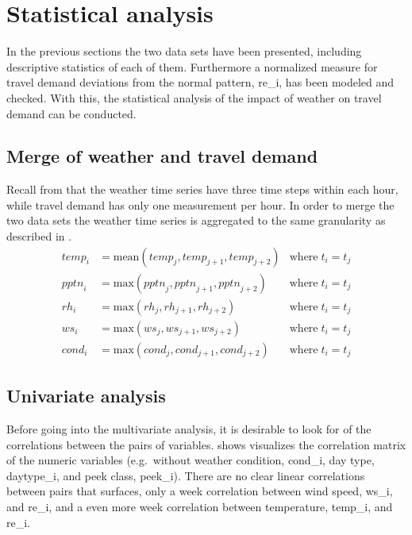 
\section{Statistical analysis}
In the previous sections the two data sets have been presented, including descriptive statistics of each of them. Furthermore a normalized measure for travel demand deviations from the normal pattern, \gls{re_i}, has been modeled and checked. With this, the statistical analysis of the impact of weather on travel demand can be conducted.

\subsection{Merge of weather and travel demand}
Recall from  that the weather time series have three time steps within each hour, while travel demand has only one measurement per hour. In order to merge the two data sets the weather time series is aggregated to the same granularity as described in .
\begin{align}
	\mathit{temp}_i &= \mathrm{mean}(\mathit{temp}_j, \mathit{temp}_{j + 1}, \mathit{temp}_{j + 2}) &\text{where} \; t_i = t_j 
	\label{eq:temp_i} \\
	\mathit{pptn}_i &= \mathrm{max}(\mathit{pptn}_j, \mathit{pptn}_{j + 1}, \mathit{pptn}_{j + 2}) &\text{where} \; t_i = t_j 
	\label{eq:pptn_i} \\
	\mathit{rh}_i &= \mathrm{max}(\mathit{rh}_j, \mathit{rh}_{j + 1}, \mathit{rh}_{j + 2}) &\text{where} \; t_i = t_j 
	\label{eq:rh_i} \\
	\mathit{ws}_i &= \mathrm{max}(\mathit{ws}_j, \mathit{ws}_{j + 1}, \mathit{ws}_{j + 2}) &\text{where} \; t_i = t_j
	\label{eq:ws_i} \\	
	\mathit{cond}_i &= \mathrm{max}(\mathit{cond}_j, \mathit{cond}_{j + 1}, \mathit{cond}_{j + 2}) &\text{where} \; t_i = t_j 
	\label{eq:cond_i}
\end{align}

\subsection{Univariate analysis}
Before going into the multivariate analysis, it is desirable to look for  of the correlations between the pairs of variables.  shows visualizes the correlation matrix of the numeric variables (e.g.\ without weather condition, \gls{cond_i}, day type, \gls{daytype_i}, and peek class, \gls{peek_i}). There are no clear linear correlations between pairs that surfaces, only a week correlation between wind speed, \gls{ws_i}, and \gls{re_i}, and a even more week correlation between temperature, \gls{temp_i}, and \gls{re_i}. 

